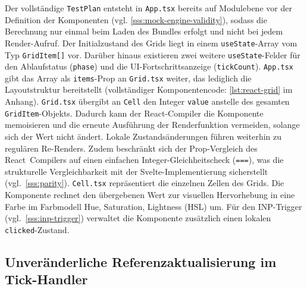 Der vollständige \texttt{TestPlan} entsteht in \texttt{App.tsx} bereits auf Modulebene vor der Definition der Komponenten (vgl. \cref{sss:mock-engine-validity}), sodass die Berechnung nur einmal beim Laden des Bundles erfolgt und nicht bei jedem Render-Aufruf. Der Initialzustand des Grids liegt in einem \texttt{useState}-Array vom Typ \texttt{GridItem[]} vor. Darüber hinaus existieren zwei weitere \texttt{useState}-Felder für den Ablaufstatus (\texttt{phase}) und die UI-Fortschrittsanzeige (\texttt{tickCount}). \texttt{App.tsx} gibt das Array als \texttt{items}-Prop an \texttt{Grid.tsx} weiter, das lediglich die Layoutstruktur bereitstellt (vollständiger Komponentencode: \cref{lst:react-grid} im Anhang). 
\noindent\texttt{Grid.tsx} übergibt an \texttt{Cell} den Integer \texttt{value} anstelle des gesamten \texttt{GridItem}-Objekts. Dadurch kann der React-Compiler die Komponente memoisieren und die erneute Ausführung der Renderfunktion vermeiden, solange sich der Wert nicht ändert. Lokale Zustandsänderungen führen weiterhin zu regulären Re-Renders.
Zudem beschränkt sich der Prop-Vergleich des React~Compilers auf einen einfachen Integer-Gleichheitscheck (\texttt{===}), was die strukturelle Vergleichbarkeit mit der Svelte-Implementierung sicherstellt (vgl.~\cref{sss:parity}). \texttt{Cell.tsx} repräsentiert die einzelnen Zellen des Grids. Die Komponente rechnet den übergebenen Wert zur visuellen Hervorhebung in eine Farbe im Farbmodell Hue, Saturation, Lightness (HSL) um. Für den INP-Trigger (vgl.~\cref{sss:inp-trigger}) verwaltet die Komponente zusätzlich einen lokalen \texttt{clicked}-Zustand.

\subsection{Unveränderliche Referenzaktualisierung im Tick-Handler}
\label{ss:impl-react-update}

